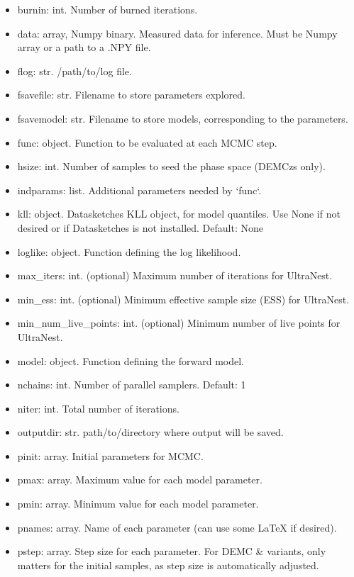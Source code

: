 \documentclass[letterpaper, 12pt]{article}
\begin{document}
\begin{itemize}
\item burnin: int. Number of burned iterations.
\item data: array, Numpy binary. Measured data for inference. Must be Numpy 
                                 array or a path to a .NPY file.
\item flog: str.   /path/to/log file.
\item fsavefile: str. Filename to store parameters explored.
\item fsavemodel: str. Filename to store models, corresponding to the parameters.
\item func: object. Function to be evaluated at each MCMC step.
\item hsize: int. Number of samples to seed the phase space (DEMCzs only).
\item indparams: list. Additional parameters needed by `func`.
\item kll: object.  Datasketches KLL object, for model quantiles.
                    Use None if not desired or if Datasketches is not installed.
                    Default: None
\item loglike: object. Function defining the log likelihood.
\item max\_iters: int. (optional) Maximum number of iterations for UltraNest.
\item min\_ess: int. (optional) Minimum effective sample size (ESS) for UltraNest.
\item min\_num\_live\_points: int. (optional) Minimum number of live points for UltraNest.
\item model: object. Function defining the forward model.
\item nchains: int. Number of parallel samplers. Default: 1
\item niter: int. Total number of iterations.
\item outputdir: str. path/to/directory where output will be saved.
\item pinit: array. Initial parameters for MCMC.
\item pmax: array. Maximum value for each model parameter.
\item pmin: array. Minimum value for each model parameter.
\item pnames: array. Name of each parameter (can use some LaTeX if desired).
\item pstep: array. Step size for each parameter.  For DEMC \& variants, only 
                    matters for the initial samples, as step size is automatically adjusted.

\end{itemize}
\end{document}
